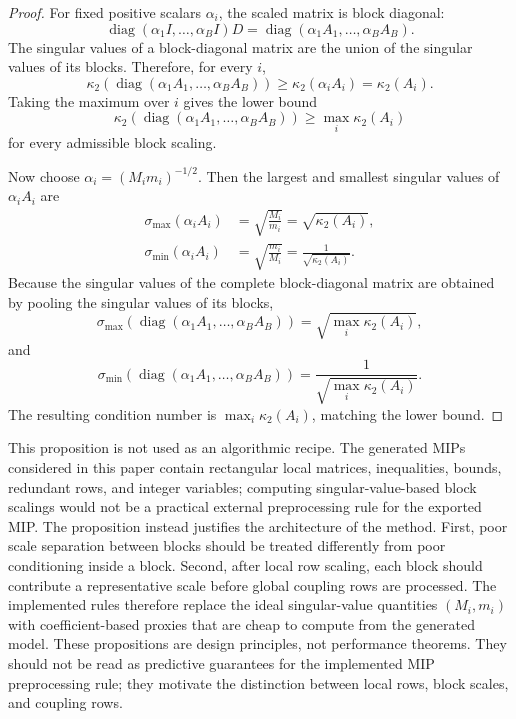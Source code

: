 \documentclass[AMA,Times1COL]{WileyNJDv5} %
\newcommand{\diag}{\operatorname{diag}}
\begin{document}
\begin{proof}
For fixed positive scalars $\alpha_i$, the scaled matrix is block diagonal:
\begin{equation*}
\diag(\alpha_1 I,\ldots,\alpha_B I)D
=
\diag(\alpha_1 A_1,\ldots,\alpha_B A_B).
\end{equation*}
The singular values of a block-diagonal matrix are the union of the singular values of
its blocks. Therefore, for every $i$,
\begin{equation*}
\kappa_2\!\left(\diag(\alpha_1 A_1,\ldots,\alpha_B A_B)\right)
\ge
\kappa_2(\alpha_i A_i)
=
\kappa_2(A_i).
\end{equation*}
Taking the maximum over $i$ gives the lower bound
\begin{equation*}
\kappa_2\!\left(\diag(\alpha_1 A_1,\ldots,\alpha_B A_B)\right)
\ge
\max_i \kappa_2(A_i)
\end{equation*}
for every admissible block scaling.

Now choose $\alpha_i=(M_i m_i)^{-1/2}$. Then the largest and smallest singular values of
$\alpha_i A_i$ are
\begin{align*}
\sigma_{\max}(\alpha_i A_i)
&=\sqrt{\frac{M_i}{m_i}}=\sqrt{\kappa_2(A_i)},\\
\sigma_{\min}(\alpha_i A_i)
&=\sqrt{\frac{m_i}{M_i}}=\frac{1}{\sqrt{\kappa_2(A_i)}}.
\end{align*}
Because the singular values of the complete block-diagonal matrix are obtained by
pooling the singular values of its blocks,
\begin{equation*}
\sigma_{\max}\!\left(\diag(\alpha_1 A_1,\ldots,\alpha_B A_B)\right)
=
\sqrt{\max_i \kappa_2(A_i)},
\end{equation*}
and
\begin{equation*}
\sigma_{\min}\!\left(\diag(\alpha_1 A_1,\ldots,\alpha_B A_B)\right)
=
\frac{1}{\sqrt{\max_i \kappa_2(A_i)}}.
\end{equation*}
The resulting condition number is $\max_i\kappa_2(A_i)$, matching the lower bound.
\end{proof}

This proposition is not used as an algorithmic recipe. The generated MIPs considered in
this paper contain rectangular local matrices, inequalities, bounds, redundant rows, and
integer variables; computing singular-value-based block scalings would not be a practical
external preprocessing rule for the exported MIP. The proposition instead justifies the
architecture of the method. First, poor scale separation between blocks should be treated
differently from poor conditioning inside a block. Second, after local row scaling, each
block should contribute a representative scale before global coupling rows are processed.
The implemented rules therefore replace the ideal singular-value quantities
$(M_i,m_i)$ with coefficient-based proxies that are cheap to compute from the generated
model. These propositions are design principles, not performance theorems. They should not be read as predictive guarantees for the implemented
MIP preprocessing rule; they motivate the distinction between local rows, block scales,
and coupling rows.
\end{document}
